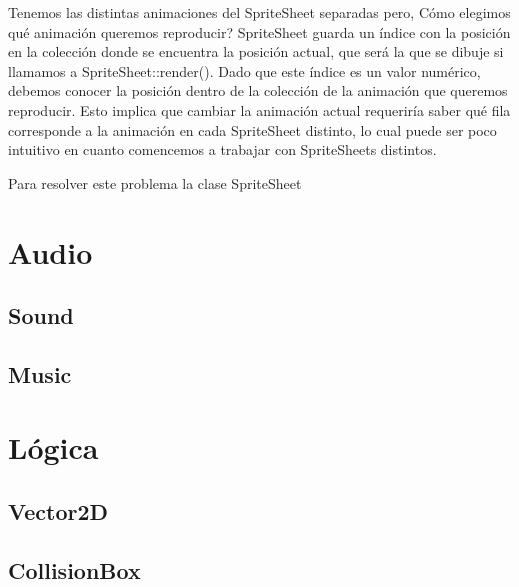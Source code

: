 \documentclass[parskip=half*]{scrartcl}
\begin{document}
			Tenemos las distintas animaciones del SpriteSheet separadas pero, \textquestiondown C\'omo elegimos qu\'e animaci\'on queremos reproducir? SpriteSheet guarda un \'indice con la posici\'on en la colecci\'on donde se encuentra la posici\'on actual, que ser\'a la que se dibuje si llamamos a SpriteSheet::render(). Dado que este \'indice es un valor num\'erico, debemos conocer la posici\'on dentro de la colecci\'on de la animaci\'on que queremos reproducir. Esto implica que cambiar la animaci\'on actual requerir\'ia saber qu\'e fila corresponde a la animaci\'on en cada SpriteSheet distinto, lo cual puede ser poco intuitivo en cuanto comencemos a trabajar con SpriteSheets distintos.

			Para resolver este problema la clase SpriteSheet

\newpage
\section{Audio}
	\subsection{Sound}

	\subsection{Music}


\newpage
\section{L\'ogica}
	\subsection{Vector2D}

	\subsection{CollisionBox}
\end{document}
